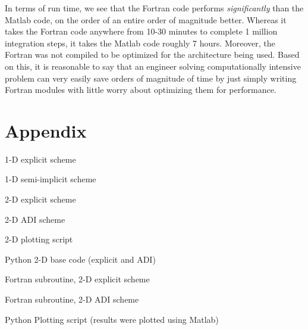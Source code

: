 \documentclass[]{article}
\theoremstyle{definition}
\numberwithin{equation}{section}
\numberwithin{equation}{section}
\begin{document}
In terms of run time, we see that the Fortran code performs \textit{significantly} than the Matlab code, on the order of an entire order of magnitude better. Whereas it takes the Fortran code anywhere from 10-30 minutes to complete 1 million integration steps, it takes the Matlab code roughly 7 hours. Moreover, the Fortran was not compiled to be optimized for the architecture being used. Based on this, it is reasonable to say that an engineer solving computationally intensive problem can very easily save orders of magnitude of time by just simply writing Fortran modules with little worry about optimizing them for performance. 
\section{Appendix}
	1-D explicit scheme
	
	1-D semi-implicit scheme
	
	2-D explicit scheme
	
	2-D ADI scheme
	
	2-D plotting script
	
	Python 2-D base code (explicit and ADI)
	
	Fortran subroutine, 2-D explicit scheme
	
	Fortran subroutine, 2-D ADI scheme
	
	Python Plotting script (results were plotted using Matlab)
	
\end{document}
